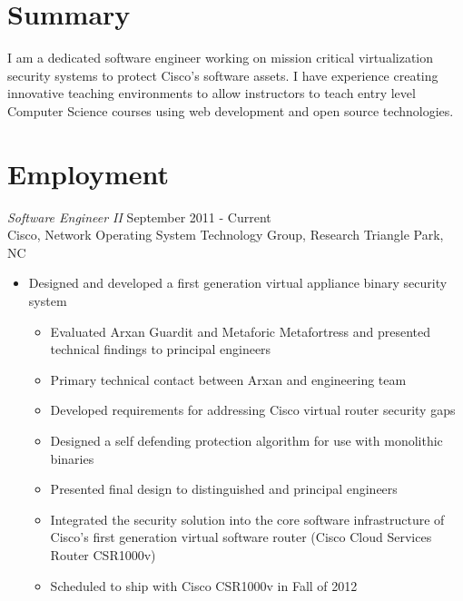 \documentclass[line,margin]{res}
\begin{document}
\address{2132 Sterling Green Dr, Morrisville, NC 27560}
\address{Email: vtwoods@gmail.com --- Cell: (703)475-1337}

 
\begin{resume}

\section{Summary} I am a dedicated software engineer working on mission critical virtualization security systems to protect Cisco's software assets.  I have experience creating innovative teaching environments to allow instructors to teach entry level Computer Science courses using web development and open source technologies.

\section{Employment}
        {\sl Software Engineer II} \hfill September 2011 - Current \\
        Cisco, Network Operating System Technology Group, Research Triangle Park, NC
        \begin{itemize}  \itemsep -2pt %
          \item Designed and developed a first generation virtual appliance binary security system
            \begin{itemize} \itemsep -2pt %
                \item Evaluated Arxan Guardit and Metaforic Metafortress and presented technical findings to principal engineers
                \item Primary technical contact between Arxan and engineering team
                \item Developed requirements for addressing Cisco virtual router security gaps
                \item Designed a self defending protection algorithm for use with monolithic binaries
                \item Presented final design to distinguished and principal engineers
                \item Integrated the security solution into the core software infrastructure of Cisco's first generation virtual software router (Cisco Cloud Services Router CSR1000v)
                \item Scheduled to ship with Cisco CSR1000v in Fall of 2012

\end{itemize}
\end{itemize}
\end{resume}
\end{document}
